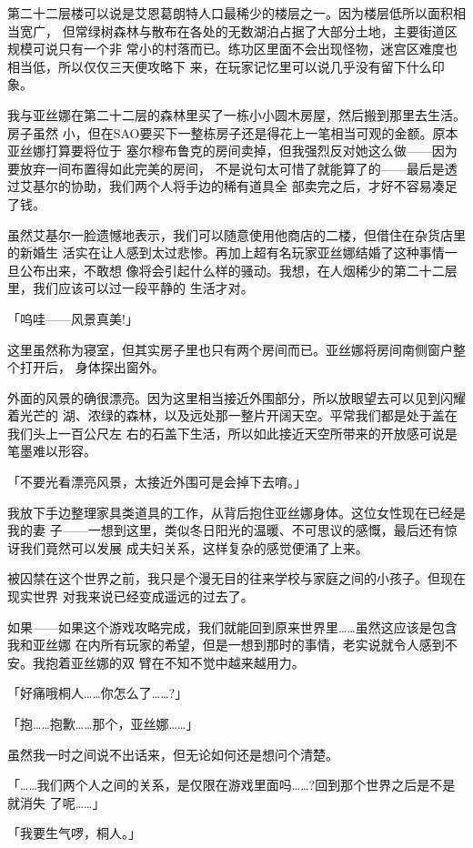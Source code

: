 \documentclass[11pt]{book}
\begin{document}
第二十二层楼可以说是艾恩葛朗特人口最稀少的楼层之一。因为楼层低所以面积相当宽广，
但常绿树森林与散布在各处的无数湖泊占据了大部分土地，主要街道区规模可说只有一个非
常小的村落而已。练功区里面不会出现怪物，迷宫区难度也相当低，所以仅仅三天便攻略下
来，在玩家记忆里可以说几乎没有留下什么印象。

我与亚丝娜在第二十二层的森林里买了一栋小小圆木房屋，然后搬到那里去生活。房子虽然
小，但在SAO要买下一整栋房子还是得花上一笔相当可观的金额。原本亚丝娜打算要将位于
塞尔穆布鲁克的房间卖掉，但我强烈反对她这么做——因为要放弃一间布置得如此完美的房间，
不是说句太可惜了就能算了的——最后是透过艾基尔的协助，我们两个人将手边的稀有道具全
部卖完之后，才好不容易凑足了钱。

虽然艾基尔一脸遗憾地表示，我们可以随意使用他商店的二楼，但借住在杂货店里的新婚生
活实在让人感到太过悲惨。再加上超有名玩家亚丝娜结婚了这种事情一旦公布出来，不敢想
像将会引起什么样的骚动。我想，在人烟稀少的第二十二层里，我们应该可以过一段平静的
生活才对。

「呜哇——风景真美!」

这里虽然称为寝室，但其实房子里也只有两个房间而已。亚丝娜将房间南侧窗户整个打开后，
身体探出窗外。

外面的风景的确很漂亮。因为这里相当接近外围部分，所以放眼望去可以见到闪耀着光芒的
湖、浓绿的森林，以及远处那一整片开阔天空。平常我们都是处于盖在我们头上一百公尺左
右的石盖下生活，所以如此接近天空所带来的开放感可说是笔墨难以形容。

「不要光看漂亮风景，太接近外围可是会掉下去唷。」

我放下手边整理家具类道具的工作，从背后抱住亚丝娜身体。这位女性现在已经是我的妻
子——一想到这里，类似冬日阳光的温暖、不可思议的感慨，最后还有惊讶我们竟然可以发展
成夫妇关系，这样复杂的感觉便涌了上来。

被囚禁在这个世界之前，我只是个漫无目的往来学校与家庭之间的小孩子。但现在现实世界
对我来说已经变成遥远的过去了。

如果——如果这个游戏攻略完成，我们就能回到原来世界里……虽然这应该是包含我和亚丝娜
在内所有玩家的希望，但是一想到那时的事情，老实说就令人感到不安。我抱着亚丝娜的双
臂在不知不觉中越来越用力。

「好痛哦桐人……你怎么了……?」

「抱……抱歉……那个，亚丝娜……」

虽然我一时之间说不出话来，但无论如何还是想问个清楚。

「……我们两个人之间的关系，是仅限在游戏里面吗……?回到那个世界之后是不是就消失
了呢……」

「我要生气啰，桐人。」
\end{document}

